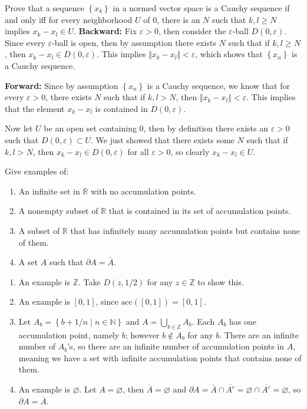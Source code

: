 \documentclass[10pt]{amsart}
\theoremstyle{plain}
\newenvironment{exercise}[1]{%
  \renewcommand\themanualtheoreminner{#1}%
  \manualtheoreminner
}{\endmanualtheoreminner}
\theoremstyle{definition}
\newcommand{\p}{\partial}
\begin{document}
\begin{exercise}{2.21}
	Prove that a sequence $\left\{ x_k \right\}$ in a normed vector space is a Cauchy sequence if and only iff for every neighborhood $U$ of 0, there is an $N$ such that $k,l \geq N$ implies $x_k - x_l\in U$.
	\hrulefill
\end{exercise}
\textbf{Backward:} Fix $\varepsilon>0$, then consider the $\varepsilon$-ball $D(0,\varepsilon)$. Since every $\varepsilon$-ball is open, then by assumption there exists $N$ such that if $k,l\geq N$, then $x_k -x_l \in D(0,\varepsilon)$. This implies $\Vert{x_k-x_l}\Vert<\varepsilon$, which shows that $\left\{ x_n \right\}$ is a Cauchy sequence.

\textbf{Forward:} Since by assumption $\left\{ x_n \right\}$ is a Cauchy sequence, we know that for every $\varepsilon>0$, there exists $N$ such that if $k,l >  N$, then $\Vert{x_k-x_l}\Vert<\varepsilon$. This implies that the element $x_k-x_l$ is contained in $D(0,\varepsilon)$.

Now let $U$ be an open set containing 0, then by definition there exists an $\varepsilon>0$ such that $D(0,\varepsilon) \subset U$. We just showed that there exists some $N$ such that if $k,l > N$, then $x_k-x_l \in D(0,\varepsilon)$ for all $\varepsilon>0$, so clearly $x_k - x_l \in U$.


\begin{exercise}{2.28}
	Give examples of:
	\begin{enumerate}
		\item An infinite set in $\mathbb{R}$ with no accumulation points.
		\item A nonempty subset of $\mathbb{R}$ that is contained in its set of accumulation points.
		\item A subset of $\mathbb{R}$ that has infinitely many accumulation points but contains none of them.
		\item A set $A$ such that $\p A = \bar{A}$.
	\end{enumerate}
	\hrulefill
\end{exercise}
\begin{enumerate}
	\item An example is $\mathbb{Z}$. Take $D(z,1/2)$ for any $z \in \mathbb{Z}$ to show this.
	\item An example is $[0,1]$, since $\text{acc}([0,1]) = [0,1]$.
	\item Let $A_b = \left\{ b + 1/n \;|\; n \in \mathbb{N}\right\}$ and $A = \bigcup_{b\in\mathbb{Z}} A_b$. Each $A_b$ has one accumulation point, namely $b$; however $b \not\in A_b$ for any $b$. There are an infinite number of $A_b$'s, so there are an infinite number of accumulation points in $A$, meaning we have a set with infinite accumulation points that contains none of them.
	\item An example is $\varnothing$. Let $A=\varnothing$, then $\overline{A}=\varnothing$ and $\p A = \overline{A} \cap \overline{A^c} = \varnothing \cap \overline{A^c} = \varnothing$, so $\p A = \overline{A}$.
\end{enumerate}
\end{document}
